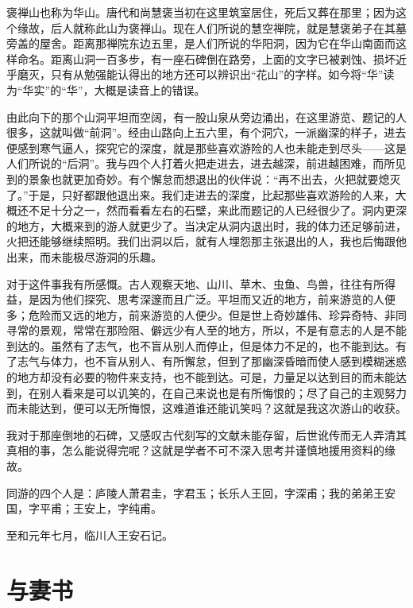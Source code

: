 \documentclass[12pt,UTF-8,openany]{ctexbook}
\begin{document}
\begin{normalsize}
    
    褒禅山也称为华山。唐代和尚慧褒当初在这里筑室居住，死后又葬在那里；因为这个缘故，后人就称此山为褒禅山。现在人们所说的慧空禅院，就是慧褒弟子在其墓旁盖的屋舍。距离那禅院东边五里，是人们所说的华阳洞，因为它在华山南面而这样命名。距离山洞一百多步，有一座石碑倒在路旁，上面的文字已被剥蚀、损坏近乎磨灭，只有从勉强能认得出的地方还可以辨识出“花山”的字样。如今将“华”读为“华实”的“华”，大概是读音上的错误。
    
    由此向下的那个山洞平坦而空阔，有一股山泉从旁边涌出，在这里游览、题记的人很多，这就叫做“前洞”。经由山路向上五六里，有个洞穴，一派幽深的样子，进去便感到寒气逼人，探究它的深度，就是那些喜欢游险的人也未能走到尽头——这是人们所说的“后洞”。我与四个人打着火把走进去，进去越深，前进越困难，而所见到的景象也就更加奇妙。有个懈怠而想退出的伙伴说：“再不出去，火把就要熄灭了。”于是，只好都跟他退出来。我们走进去的深度，比起那些喜欢游险的人来，大概还不足十分之一，然而看看左右的石壁，来此而题记的人已经很少了。洞内更深的地方，大概来到的游人就更少了。当决定从洞内退出时，我的体力还足够前进，火把还能够继续照明。我们出洞以后，就有人埋怨那主张退出的人，我也后悔跟他出来，而未能极尽游洞的乐趣。
    
    对于这件事我有所感慨。古人观察天地、山川、草木、虫鱼、鸟兽，往往有所得益，是因为他们探究、思考深邃而且广泛。平坦而又近的地方，前来游览的人便多；危险而又远的地方，前来游览的人便少。但是世上奇妙雄伟、珍异奇特、非同寻常的景观，常常在那险阻、僻远少有人至的地方，所以，不是有意志的人是不能到达的。虽然有了志气，也不盲从别人而停止，但是体力不足的，也不能到达。有了志气与体力，也不盲从别人、有所懈怠，但到了那幽深昏暗而使人感到模糊迷惑的地方却没有必要的物件来支持，也不能到达。可是，力量足以达到目的而未能达到，在别人看来是可以讥笑的，在自己来说也是有所悔恨的；尽了自己的主观努力而未能达到，便可以无所悔恨，这难道谁还能讥笑吗？这就是我这次游山的收获。
    
    我对于那座倒地的石碑，又感叹古代刻写的文献未能存留，后世讹传而无人弄清其真相的事，怎么能说得完呢？这就是学者不可不深入思考并谨慎地援用资料的缘故。
    
    同游的四个人是：庐陵人萧君圭，字君玉；长乐人王回，字深甫；我的弟弟王安国，字平甫；王安上，字纯甫。
    
    至和元年七月，临川人王安石记。
    
\end{normalsize}



\chapter{与妻书}
\end{document}
